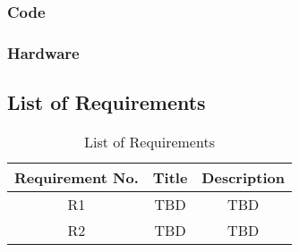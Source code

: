 \documentclass[11pt]{article}
\begin{document}
\subsubsection{Code}

\subsubsection{Hardware}


\subsection{List of Requirements}
\begin{table}[h]
    \centering
    \caption{List of Requirements}
    \begin{tabular}{ccc}
        \toprule
        Requirement No. & Title & Description \\
        \midrule
        R1 & TBD & TBD \\
        R2 & TBD & TBD \\
        \bottomrule
    \end{tabular}
    \label{tab:docs_rev_hist}
\end{table}
\end{document}
